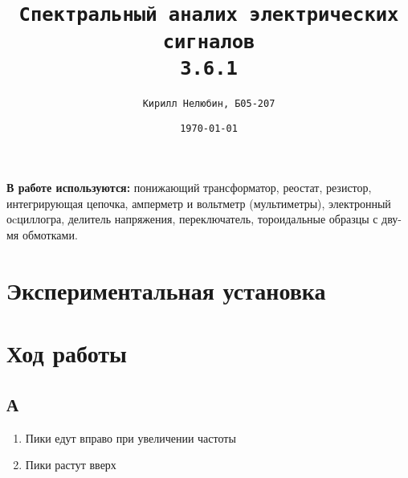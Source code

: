 \documentclass[14pt,a4paper]{article}
\title{\texttt{Спектральный аналих электрических сигналов\\ 3.6.1}}
\author{\texttt{Кирилл Нелюбин, Б05-207}}
\date{\texttt{\today}}
\begin{document}
\maketitle


\textbf{В работе используются:}  
понижающий трансформатор, реостат, резистор, интегрирующая цепочка, амперметр и вольтметр (мультиметры), электронный оcциллогра, делитель напряжения, переключатель, тороидальные образцы с дву-
мя обмотками.


\section*{Экспериментальная установка}


\newpage
\section*{Ход работы}
\subsection*{А}
\begin{enumerate}
  \item Пики едут вправо при увеличении частоты
  \item Пики растут вверх
\end{enumerate}
\end{document}
